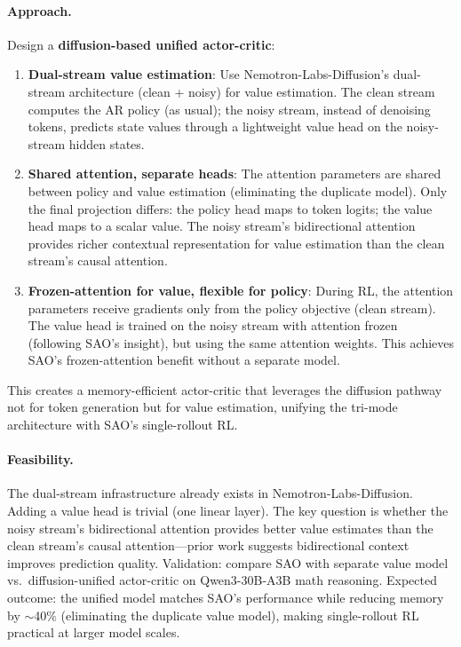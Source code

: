 \documentclass[11pt,a4paper]{article}
\begin{document}
\paragraph{Approach.} Design a \textbf{diffusion-based unified actor-critic}:
\begin{enumerate}
\item \textbf{Dual-stream value estimation}: Use Nemotron-Labs-Diffusion's dual-stream architecture (clean + noisy) for value estimation. The clean stream computes the AR policy (as usual); the noisy stream, instead of denoising tokens, predicts state values through a lightweight value head on the noisy-stream hidden states.
\item \textbf{Shared attention, separate heads}: The attention parameters are shared between policy and value estimation (eliminating the duplicate model). Only the final projection differs: the policy head maps to token logits; the value head maps to a scalar value. The noisy stream's bidirectional attention provides richer contextual representation for value estimation than the clean stream's causal attention.
\item \textbf{Frozen-attention for value, flexible for policy}: During RL, the attention parameters receive gradients only from the policy objective (clean stream). The value head is trained on the noisy stream with attention frozen (following SAO's insight), but using the same attention weights. This achieves SAO's frozen-attention benefit without a separate model.
\end{enumerate}
This creates a memory-efficient actor-critic that leverages the diffusion pathway not for token generation but for value estimation, unifying the tri-mode architecture with SAO's single-rollout RL.

\paragraph{Feasibility.} The dual-stream infrastructure already exists in Nemotron-Labs-Diffusion. Adding a value head is trivial (one linear layer). The key question is whether the noisy stream's bidirectional attention provides better value estimates than the clean stream's causal attention---prior work suggests bidirectional context improves prediction quality. Validation: compare SAO with separate value model vs.\ diffusion-unified actor-critic on Qwen3-30B-A3B math reasoning. Expected outcome: the unified model matches SAO's performance while reducing memory by $\sim$40\% (eliminating the duplicate value model), making single-rollout RL practical at larger model scales.
\end{document}
